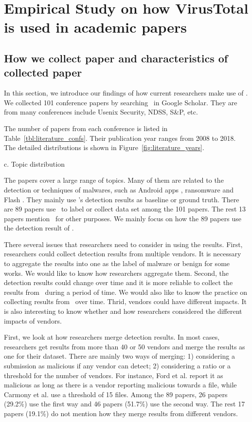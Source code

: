 \section{Empirical Study on how VirusTotal is used in academic papers}

\subsection{How we collect paper and characteristics of collected paper}

In this section, we introduce our findings of how current researchers make use of \vt. 
We collected 101 conference papers by searching \vt\ in Google Scholar. 
They are from many conferences include Usenix Security, NDSS, S\&P, etc. 

%

The number of papers from each conference is listed in Table~\ref{tbl:literature_confs}. 
Their publication year ranges from 2008 to 2018. The detailed distributions is shown in Figure~\ref{fig:literature_years}.

c. Topic distribution 

The papers cover a large range of topics. 
Many of them are related to the detection or techniques of malwares, such as Android apps \cite{arp2014drebin,huangvt2016bigdata}, ransomware \cite{kharraz2016unveil} and Flash \cite{ford2009analyzing}. 
They mainly use \vt's detection results as baseline or ground truth. 
There are 89 papers use \vt\ to label or collect data set among the 101 papers. 
The rest 13 papers mention \vt\ for other purposes. 
We mainly focus on how the 89 papers use the detection result of \vt.

There several issues that researchers need to consider in using the results. 
First, researchers could collect detection results from multiple vendors. 
It is necessary to aggregate the results into one as the label of malware or benign for some works. 
We would like to know how researchers aggregate them. 
Second, the detection results could change over time and it is more reliable to collect the results from \vt\ during a period of time. 
We would also like to know the practice on collecting results from \vt\ over time. 
Thrid, vendors could have different impacts. 
It is also interesting to know whether and how researchers considered the different impacts of vendors.

First, we look at how researchers merge detection results. 
In most cases, researchers get results from more than 40 or 50 vendors and merge the results as one for their dataset. 
There are mainly two ways of merging: 1) considering a submission as malicious if any vendor can detect; 2) considering a ratio or a threshold for the number of vendors. 
For instance, Ford et al. \cite{ford2009analyzing} report it as malicious as long as there is a vendor reporting malicious
towards a file, while Carmony et al. use a threshold of 15 files. 
Among the 89 papers, 26 papers (29.2\%) use the first way and 46 papers  (51.7\%) use the second way. 
The rest 17 papers (19.1\%) do not mention how they merge results from different vendors.

